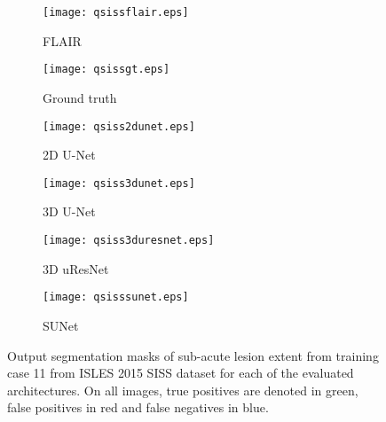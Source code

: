 \documentclass[letterpaper,final,authoryear,3p,times,twocolumn]{elsarticle}
\begin{document}
\def\qsubfig{0.162\textwidth}
\begin{figure*}
	\centering
	\begin{subfigure}[b]{\qsubfig}
		\texttt{[image: qsissflair.eps]}
		\caption{FLAIR}
	\end{subfigure}
	\begin{subfigure}[b]{\qsubfig}
		\texttt{[image: qsissgt.eps]}
		\caption{Ground truth}
	\end{subfigure}
	\begin{subfigure}[b]{\qsubfig}
		\texttt{[image: qsiss2dunet.eps]}
		\caption{2D U-Net}
	\end{subfigure} 
	\begin{subfigure}[b]{\qsubfig}
		\texttt{[image: qsiss3dunet.eps]}
		\caption{3D U-Net}
	\end{subfigure}
	\begin{subfigure}[b]{\qsubfig}
		\texttt{[image: qsiss3duresnet.eps]}
		\caption{3D uResNet}
	\end{subfigure}
	\begin{subfigure}[b]{\qsubfig}
		\texttt{[image: qsisssunet.eps]}
		\caption{SUNet}
	\end{subfigure}
	\caption{Output segmentation masks of sub-acute lesion extent from training case 11 from ISLES 2015 SISS dataset for each of the evaluated architectures. On all images, true positives are denoted in green, false positives in red and false negatives in blue.}
	\label{fig:qsiss}
\end{figure*}
\end{document}
